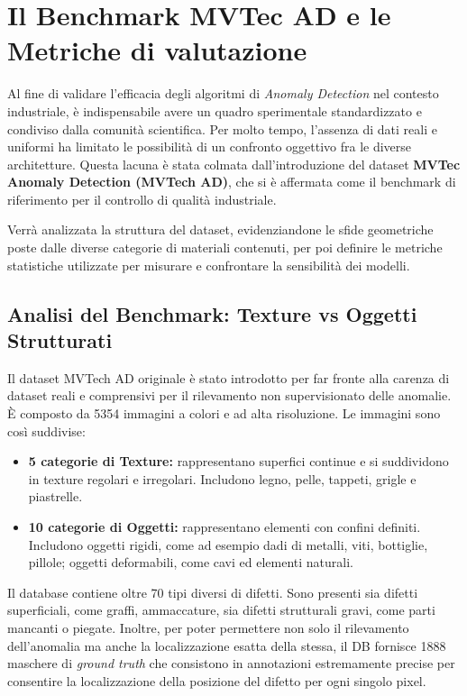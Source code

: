 \section{Il Benchmark MVTec AD e le Metriche di valutazione}

Al fine di validare l'efficacia degli algoritmi di \textit{Anomaly Detection} nel contesto industriale, è indispensabile avere un quadro sperimentale standardizzato e condiviso dalla comunità scientifica. 
Per molto tempo, l'assenza di dati reali e uniformi ha limitato le possibilità di un confronto oggettivo fra le diverse architetture. Questa lacuna è stata colmata dall'introduzione del dataset \textbf{MVTec Anomaly Detection (MVTech AD)}, che si è affermata come il benchmark di riferimento per il controllo di qualità industriale.

Verrà analizzata la struttura del dataset, evidenziandone le sfide geometriche poste dalle diverse categorie di materiali contenuti, per poi definire le metriche statistiche utilizzate per misurare e confrontare la sensibilità dei modelli.


\subsection{Analisi del Benchmark: Texture vs Oggetti Strutturati}

Il dataset MVTech AD originale è stato introdotto per far fronte alla carenza di dataset reali e comprensivi per il rilevamento non supervisionato delle anomalie. È composto da 5354 immagini a colori e ad alta risoluzione. 
Le immagini sono così suddivise:
\begin{itemize}
    \item \textbf{5 categorie di Texture:} rappresentano superfici continue e si suddividono in texture regolari e irregolari. Includono legno, pelle, tappeti, grigle e piastrelle.
    \item \textbf{10 categorie di Oggetti:} rappresentano elementi con confini definiti. Includono oggetti rigidi, come ad esempio dadi di metalli, viti, bottiglie, pillole; oggetti deformabili, come cavi ed elementi naturali.
\end{itemize}
Il database contiene oltre 70 tipi diversi di difetti. Sono presenti sia difetti superficiali, come graffi, ammaccature, sia difetti strutturali gravi, come parti mancanti o piegate. Inoltre, per poter permettere non solo il rilevamento dell'anomalia ma anche la localizzazione esatta della stessa, il DB fornisce 1888 maschere di \textit{ground truth} che consistono in annotazioni estremamente precise per consentire la localizzazione della posizione del difetto per ogni singolo pixel. \cite{Bergmann_et_al._2019}


